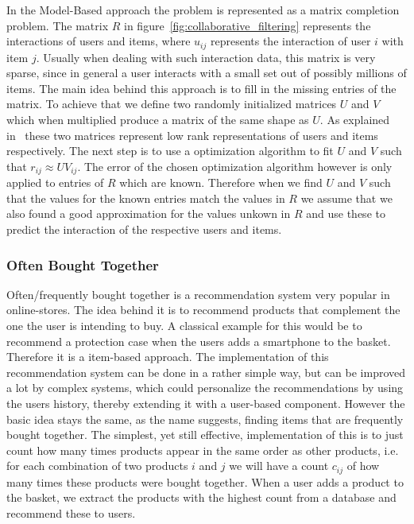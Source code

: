 In the Model-Based approach the problem is represented as a matrix completion problem.
The matrix $R$ in figure~\ref{fig:collaborative_filtering} represents the interactions of users and items, where $u_{ij}$ represents the interaction of user $i$ with item $j$.
Usually when dealing with such interaction data, this matrix is very sparse, since in general a user interacts with a small set out of possibly millions of items.
The main idea behind this approach is to fill in the missing entries of the matrix.
To achieve that we define two randomly initialized matrices $U$ and $V$ which when multiplied produce a matrix of the same shape as $U$.
As explained in~\cite{collaborative_filtering} these two matrices represent low rank representations of users and items respectively.
The next step is to use a optimization algorithm to fit $U$ and $V$ such that $r_{ij} \approx UV_{ij}$.
The error of the chosen optimization algorithm however is only applied to entries of $R$ which are known.
Therefore when we find $U$ and $V$ such that the values for the known entries match the values in $R$ we assume that we also found a good approximation for the values unkown in $R$ and use these to predict the interaction of the respective users and items.

\subsubsection{Often Bought Together}\label{sec:often_bought_together}
Often/frequently bought together is a recommendation system very popular in online-stores.
The idea behind it is to recommend products that complement the one the user is intending to buy.
A classical example for this would be to recommend a protection case when the users adds a smartphone to the basket.
Therefore it is a item-based approach.
The implementation of this recommendation system can be done in a rather simple way, but can be improved a lot by complex systems, which could personalize the recommendations by using the users history, thereby extending it with a user-based component.
However the basic idea stays the same, as the name suggests, finding items that are frequently bought together.
The simplest, yet still effective, implementation of this is to just count how many times products appear in the same order as other products, i.e. for each combination of two products $i$ and $j$ we will have a count $c_{ij}$ of how many times these products were bought together.
When a user adds a product to the basket, we extract the products with the highest count from a database and recommend these to users.

